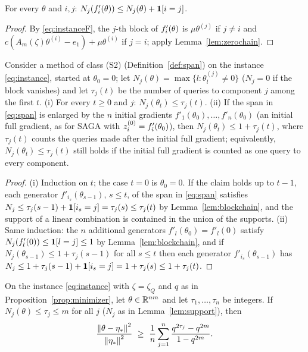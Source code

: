 \begin{lemma}
\label{lem:blockchain}
For every $\theta$ and $i,j$: $N_j(f'_i(\theta))\le N_j(\theta)+\mathbf{1}[i=j]$.
\end{lemma}

\begin{proof}
By \eqref{eq:instanceF}, the $j$-th block of $f'_i(\theta)$ is $\mu\theta^{(j)}$ if $j\ne i$ and $c(A_m(\zeta)\theta^{(i)}-e_1)+\mu\theta^{(i)}$ if $j=i$; apply Lemma~\ref{lem:zerochain}.
\end{proof}

\begin{lemma}
\label{lem:support}
Consider a method of class (S2) (Definition~\ref{def:span}) on the instance \eqref{eq:instance}, started at $\theta_0=0$; let $N_j(\theta)=\max\{l:\theta^{(j)}_l\neq0\}$ ($N_j=0$ if the block vanishes) and let $\tau_j(t)$ be the number of queries to component $j$ among the first $t$. (i) For every $t\ge0$ and $j$: $N_j(\theta_t)\le\tau_j(t)$. (ii) If the span in \eqref{eq:span} is enlarged by the $n$ initial gradients $f'_1(\theta_0),\dots,f'_n(\theta_0)$ (an initial full gradient, as for SAGA with $z_i^{(0)}=f'_i(\theta_0)$), then $N_j(\theta_t)\le1+\tau_j(t)$, where $\tau_j(t)$ counts the queries made after the initial full gradient; equivalently, $N_j(\theta_t)\le\tau_j(t)$ still holds if the initial full gradient is counted as one query to every component.
\end{lemma}

\begin{proof}
(i) Induction on $t$; the case $t=0$ is $\theta_0=0$. If the claim holds up to $t-1$, each generator $f'_{i_s}(\theta_{s-1})$, $s\le t$, of the span in \eqref{eq:span} satisfies $N_j\le\tau_j(s-1)+\mathbf{1}[i_s=j]=\tau_j(s)\le\tau_j(t)$ by Lemma~\ref{lem:blockchain}, and the support of a linear combination is contained in the union of the supports. (ii) Same induction: the $n$ additional generators $f'_l(\theta_0)=f'_l(0)$ satisfy $N_j(f'_l(0))\le\mathbf{1}[l=j]\le1$ by Lemma~\ref{lem:blockchain}, and if $N_j(\theta_{s-1})\le1+\tau_j(s-1)$ for all $s\le t$ then each generator $f'_{i_s}(\theta_{s-1})$ has $N_j\le1+\tau_j(s-1)+\mathbf{1}[i_s=j]=1+\tau_j(s)\le1+\tau_j(t)$.
\end{proof}

\begin{proposition}
\label{prop:tail}
On the instance \eqref{eq:instance} with $\zeta=\zeta_Q$ and $q$ as in Proposition~\ref{prop:minimizer}, let $\theta\in\mathbb{R}^{nm}$ and let $\tau_1,\dots,\tau_n$ be integers. If $N_j(\theta)\le\tau_j\le m$ for all $j$ ($N_j$ as in Lemma~\ref{lem:support}), then
\begin{equation}
\label{ineq:tail}
\frac{\norm{\theta-\etastar}^2}{\norm{\etastar}^2}\ \ge\ \frac1n\sum_{j=1}^n\frac{q^{2\tau_j}-q^{2m}}{1-q^{2m}} .
\end{equation}
\end{proposition}

